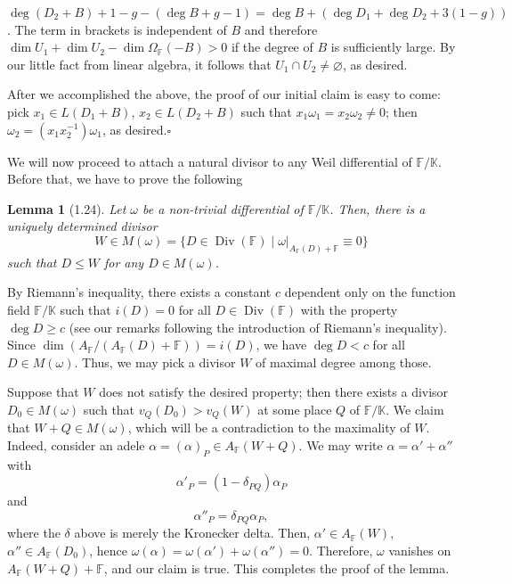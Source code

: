 \documentclass[11pt]{article}
\makeatletter
\theoremstyle{scplain}
\newtheorem*{lemma}{Lemma}
\renewenvironment{proof}[1][\proofname]{%
  \par\pushQED{\qed}\normalfont\topsep6\p@\@plus6\p@\relax
  \trivlist\item[\hskip\labelsep\scshape #1\@addpunct{.}]\ignorespaces}%
  {\popQED\endtrivlist\@endpefalse}
\DeclareMathOperator{\Div}{Div}
\makeatother
\begin{document}
\noindent
$\deg(D_2+B)+1-g-(\deg B+g-1)
= \deg B+(\deg D_1+\deg D_2+3(1-g))$. The term in brackets is independent of
$B$ and therefore
$\dim U_1+\dim U_2-\dim\Omega_{\mathbb{F}}(-B)>0$ if the degree of $B$ is
sufficiently large. By our little fact from linear algebra, it follows that
$U_1 \cap U_2 \neq \varnothing$, as desired.

After we accomplished the above, the proof of our initial claim is easy to come:
pick $x_1 \in L(D_1+B)$, $x_2 \in L(D_2+B)$ such that
$x_1\omega_1=x_2\omega_2 \neq 0$; then
$\omega_2=(x_1x_2^{-1})\omega_1$, as desired.\hfill$\square$

We will now proceed to attach a natural divisor to any Weil differential of
$\mathbb{F}/\mathbb{K}$. Before that, we have to prove the following

\begin{lemma}[1.24]
Let $\omega$ be a non-trivial differential of $\mathbb{F}/\mathbb{K}$. Then,
there is a uniquely determined divisor
\[
  W \in M(\omega) =
    \{D \in \Div(\mathbb{F}) \mid
      \omega\big|_{A_{\mathbb{F}}(D)+\mathbb{F}} \equiv 0\}
\]
such that $D \leq W$ for any $D \in M(\omega)$.
\end{lemma}

\begin{proof}
By Riemann's inequality, there exists a constant $c$ dependent only on the
function field $\mathbb{F}/\mathbb{K}$ such that $i(D)=0$ for all
$D \in \Div(\mathbb{F})$ with the property $\deg D \geq c$ (see our remarks
following the introduction of Riemann's inequality). Since
$\dim(A_{\mathbb{F}}/(A_{\mathbb{F}}(D)+\mathbb{F}))=i(D)$, we have
$\deg D<c$ for all $D \in M(\omega)$. Thus, we may pick a divisor $W$ of maximal
degree among those.

Suppose that $W$ does not satisfy the desired property; then there exists a
divisor $D_0 \in M(\omega)$ such that $v_Q(D_0)>v_Q(W)$ at some place $Q$ of
$\mathbb{F}/\mathbb{K}$. We claim that $W+Q \in M(\omega)$, which will be a
contradiction to the maximality of $W$. Indeed, consider an adele
$\alpha=(\alpha)_P \in A_{\mathbb{F}}(W+Q)$. We may write
$\alpha=\alpha'+\alpha''$ with
\[
  \alpha'_P=(1-\delta_{PQ})\alpha_P
\]
and
\[
  \alpha''_P=\delta_{PQ}\alpha_P,
\]
where the $\delta$ above is merely the Kronecker delta. Then,
$\alpha' \in A_{\mathbb{F}}(W)$, $\alpha'' \in A_{\mathbb{F}}(D_0)$, hence
$\omega(\alpha)=\omega(\alpha')+\omega(\alpha'')=0$. Therefore, $\omega$
vanishes on $A_{\mathbb{F}}(W+Q)+\mathbb{F}$, and our claim is true. This
completes the proof of the lemma.
\end{proof}
\end{document}
